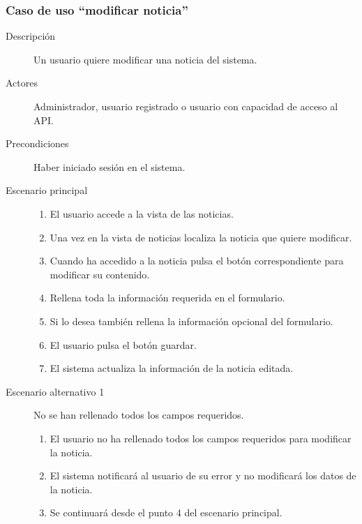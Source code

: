 \subsubsection{Caso de uso ``modificar noticia''}
\begin{description}
\item[Descripción]  Un usuario quiere modificar una noticia del sistema.
\item[Actores]  Administrador, usuario registrado o usuario con capacidad de acceso al API.
\item[Precondiciones]  Haber iniciado sesión en el sistema.
\item[Escenario principal]	\hfill
							\begin{enumerate}
							\item El usuario accede a la vista de las noticias.
							\item Una vez en la vista de noticias localiza la noticia que quiere modificar.
							\item Cuando ha accedido a la noticia pulsa el botón correspondiente para modificar su contenido.
							\item Rellena toda la información requerida en el formulario.
							\item Si lo desea también rellena la información opcional del formulario.
							\item El usuario pulsa el botón guardar.
							\item El sistema actualiza la información de la noticia editada.
							\end{enumerate}
\item[Escenario alternativo 1] No se han rellenado todos los campos requeridos.
							\begin{enumerate}
							\item El usuario no ha rellenado todos los campos requeridos para modificar la noticia.
							\item El sistema notificará al usuario de su error y no modificará los datos de la noticia.
							\item Se continuará desde el punto 4 del escenario principal.
							\end{enumerate}
\end{description}



